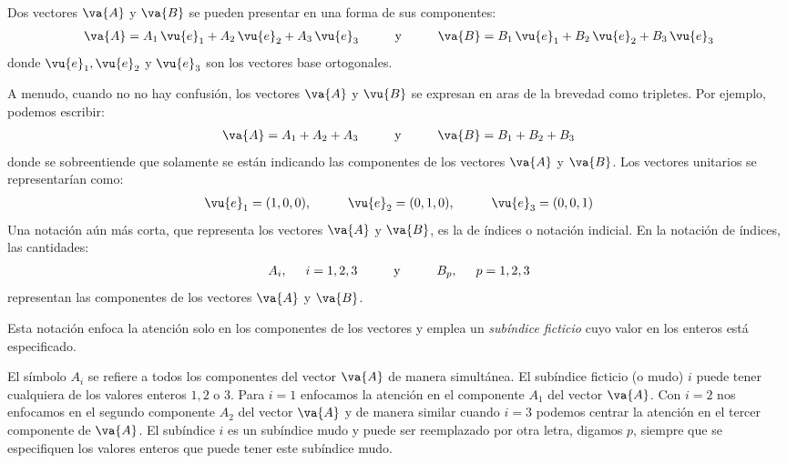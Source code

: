 Dos vectores $\va{A}$ y $\va{B}$ se pueden presentar en una forma de sus componentes:
\begin{align*}
\va{A} = A_{1} \, \vu{e}_{1} + A_{2} \, \vu{e}_{2} + A_{3} \, \vu{e}_{3} \hspace{1cm} \mbox{y} \hspace{1cm} \va{B} = B_{1} \, \vu{e}_{1} + B_{2} \, \vu{e}_{2} + B_{3} \, \vu{e}_{3}
\end{align*}
donde $\vu{e}_{1}, \vu{e}_{2}$ y $\vu{e}_{3}$ son los vectores base ortogonales.
\par
A menudo, cuando no no hay confusión, los vectores $\va{A}$ y $\vu{B}$ se expresan en aras de la brevedad como tripletes. Por ejemplo, podemos escribir:
\begin{align*}
\va{A} = A_{1} + A_{2} + A_{3}  \hspace{1cm} \mbox{y} \hspace{1cm} \va{B} = B_{1} + B_{2} + B_{3}
\end{align*}
donde se sobreentiende que solamente se están indicando las componentes de los vectores $\va{A}$ y $\va{B}$. Los vectores unitarios se representarían como:
\begin{align*}
\vu{e}_{1} = (1, 0, 0), \hspace{1cm} \vu{e}_{2} = (0, 1, 0), \hspace{1cm} \vu{e}_{3} = (0, 0, 1)
\end{align*}
Una notación aún más corta, que representa los vectores $\va{A}$ y $\va{B}$, es la de índices o notación indicial. En la notación de índices, las cantidades:
\begin{align*}
A_{i}, \hspace{0.5cm} i = 1, 2, 3 \hspace{1cm} \mbox{y} \hspace{1cm} B_{p}, \hspace{0.5cm} p = 1, 2, 3
\end{align*}
representan las componentes de los vectores $\va{A}$ y $\va{B}$.
\par
Esta notación enfoca la atención solo en los componentes de los vectores y emplea un \emph{subíndice ficticio} cuyo valor en los enteros está especificado.
\par
El símbolo $A_{i}$ se refiere a todos los componentes del vector $\va{A}$ de manera simultánea. El subíndice ficticio (o mudo) $i$ puede tener cualquiera de los valores enteros $1, 2$ o $3$. Para $i = 1$ enfocamos la atención en el componente $A_{1}$ del vector $\va{A}$. Con $i = 2$ nos enfocamos en el segundo componente $A_{2}$ del vector $\va{A}$ y de manera similar cuando $i = 3$ podemos centrar la atención en el tercer componente de $\va{A}$. El subíndice $i$ es un subíndice mudo y puede ser reemplazado por otra letra, digamos $p$, siempre que se especifiquen los valores enteros que puede tener este subíndice mudo.

